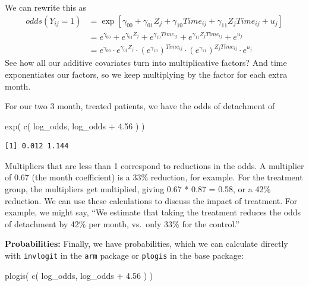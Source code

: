 \documentclass[
  letterpaper,
  DIV=11,
  numbers=noendperiod]{scrreprt}
\newenvironment{Shaded}{}{}
\newcommand{\FloatTok}[1]{\textcolor[rgb]{0.25,0.63,0.44}{#1}}
\newcommand{\FunctionTok}[1]{\textcolor[rgb]{0.02,0.16,0.49}{#1}}
\newcommand{\NormalTok}[1]{#1}
\newcommand{\SpecialCharTok}[1]{\textcolor[rgb]{0.25,0.44,0.63}{#1}}
\begin{document}
We can rewrite this as \[
\begin{aligned}
odds( Y_{ij} = 1 ) &= \exp\left[ \gamma_{00} + \gamma_{01} Z_j + \gamma_{10} Time_{ij} + \gamma_{11} Z_j Time_{ij} + u_j \right] \\
&= e^{\gamma_{00}} + e^{\gamma_{01} Z_j} + e^{\gamma_{10} Time_{ij}} + e^{\gamma_{11} Z_j Time_{ij}} + e^{u_j} \\
&= e^{\gamma_{00}} \cdot e^{\gamma_{01} Z_j} \cdot \left(e^{\gamma_{10}}\right)^{Time_{ij}} \cdot \left(e^{\gamma_{11}}\right)^{Z_j Time_{ij}} \cdot e^{u_j} 
\end{aligned}
\] See how all our additive covariates turn into multiplicative factors?
And time exponentiates our factors, so we keep multiplying by the factor
for each extra month.

For our two 3 month, treated patients, we have the odds of detachment of

\begin{Shaded}
\begin{Highlighting}[]
\FunctionTok{exp}\NormalTok{( }\FunctionTok{c}\NormalTok{( log\_odds, log\_odds }\SpecialCharTok{+} \FloatTok{4.56}\NormalTok{ ) )}
\end{Highlighting}
\end{Shaded}

\begin{verbatim}
[1] 0.012 1.144
\end{verbatim}

Multipliers that are less than 1 correspond to reductions in the odds. A
multiplier of 0.67 (the month coefficient) is a 33\% reduction, for
example. For the treatment group, the multipliers get multiplied, giving
0.67 * 0.87 = 0.58, or a 42\% reduction. We can use these calculations
to discuss the impact of treatment. For example, we might say, ``We
estimate that taking the treatment reduces the odds of detachment by
42\% per month, vs.~only 33\% for the control.''

\textbf{Probabilities:} Finally, we have probabilities, which we can
calculate directly with \texttt{invlogit} in the \texttt{arm} package or
\texttt{plogis} in the base package:

\begin{Shaded}
\begin{Highlighting}[]
\FunctionTok{plogis}\NormalTok{( }\FunctionTok{c}\NormalTok{( log\_odds, log\_odds }\SpecialCharTok{+} \FloatTok{4.56}\NormalTok{ ) )}
\end{Highlighting}
\end{Shaded}
\end{document}
